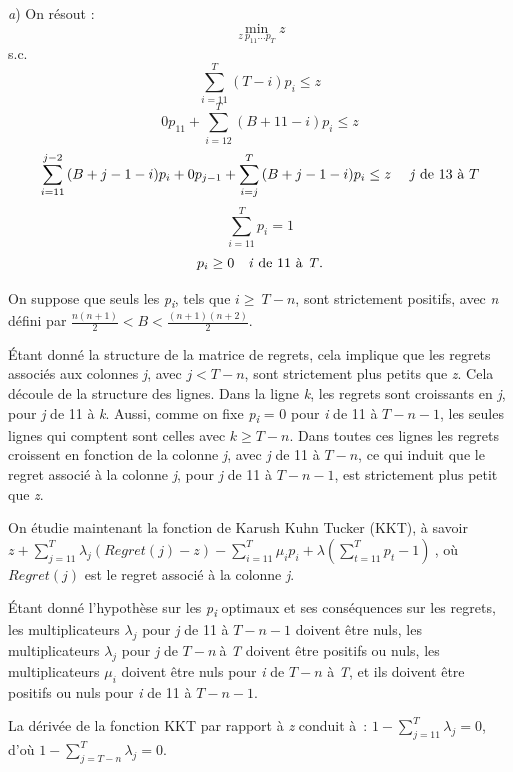 \begin{Article}
\begin{refsection}[UmbhauerFR]
\begin{appendices}
\emph{a}) On résout :
\[
\min_{z\ p_{11}\ldots p_{T}}z
\]
s.c.
\[
\sum_{i = 11}^{T}{(T - i)p_{i}} \leq z
\]
\[
0p_{11} + \sum_{i = 12}^{T}{(B + 11 - i)p_{i} \leq z} \tag{A1}
\]
\[
\sum_{i = 11}^{j - 2}{(B + j - 1 - i)p_{i} + 0p_{j - 1} + \sum_{i = j}^{T}{(B + j - 1 - i)p_{i} \leq z}} \quad \text{ \emph{j} de 13 à } T
\]
\[
\sum_{i = 11}^{T}{p_{i} = 1}
\]
\[
p_{i} \geq 0 \quad \text{\emph{i} de 11 à \emph{T}}.
\]

On suppose que seuls les \emph{p\textsubscript{i}}, tels que
\(i \geq \ T - n\), sont strictement positifs, avec \emph{n} défini par
\(\frac{n(n + 1)}{2} < B < \frac{(n + 1)(n + 2)}{2}\).

Étant donné la structure de la matrice de regrets, cela implique que les
regrets associés aux colonnes \emph{j}, avec \(j < T - n\), sont
strictement plus petits que \emph{z}. Cela découle de la structure des
lignes. Dans la ligne \emph{k}, les regrets sont croissants en \emph{j},
pour \emph{j} de 11 à \emph{k}. Aussi, comme on fixe
\emph{p\textsubscript{i}} = 0 pour \emph{i} de 11 à \(T - n - 1\), les
seules lignes qui comptent sont celles avec \(k \geq T - n\). Dans
toutes ces lignes les regrets croissent en fonction de la colonne
\emph{j}, avec \emph{j} de 11 à \(T - n\), ce qui induit que le regret
associé à la colonne \emph{j}, pour \emph{j} de 11 à \(T - n - 1\), est
strictement plus petit que \emph{z}.

On étudie maintenant la fonction de Karush Kuhn Tucker (KKT), à savoir
\(z + \sum_{j = 11}^{T}{\lambda_{j}(Regret(j) - z)} - \sum_{i = 11}^{T}{\mu_{i}p_{i} + \lambda\left( \sum_{t = 11}^{T}p_{t} - 1 \right)}\ \),
où $Regret(j)$ est le regret associé à la colonne \emph{j}.

Étant donné l'hypothèse sur les \emph{p\textsubscript{i}} optimaux et
ses conséquences sur les regrets, les multiplicateurs \(\lambda_{j}\)
pour \emph{j} de 11 à \(T - n - 1\) doivent être nuls, les
multiplicateurs \(\lambda_{j}\) pour \emph{j} de \(T - n\ \)à \emph{T}
doivent être positifs ou nuls, les multiplicateurs $\mu_i$ doivent être nuls pour \emph{i} de \(T - n\) à \emph{T}, et ils doivent être positifs ou nuls pour \emph{i} de 11 à \(T - n - 1\).

La dérivée de la fonction KKT par rapport à \emph{z} conduit à~: \(1 - \sum_{j = 11}^{T}\lambda_{j} = 0\), d'où \(1 - \sum_{j = T - n}^{T}\lambda_{j} = 0\).


\end{appendices}
\end{refsection}
\end{Article}
